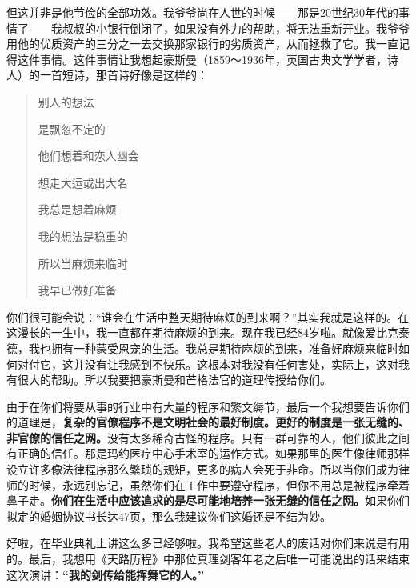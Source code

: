 但这并非是他节俭的全部功效。我爷爷尚在人世的时候——那是20世纪30年代的事情了——我叔叔的小银行倒闭了，如果没有外力的帮助，将无法重新开业。我爷爷用他的优质资产的三分之一去交换那家银行的劣质资产，从而拯救了它。我一直记得这件事情。这件事情让我想起豪斯曼（1859～1936年，英国古典文学学者，诗人）的一首短诗，那首诗好像是这样的：
\par

\begin{quotation}
别人的想法
\par

是飘忽不定的
\par

他们想着和恋人幽会
\par

想走大运或出大名
\par

我总是想着麻烦
\par

我的想法是稳重的
\par

所以当麻烦来临时
\par

我早已做好准备
\par
\end{quotation}

你们很可能会说：“谁会在生活中整天期待麻烦的到来啊？”其实我就是这样的。在这漫长的一生中，我一直都在期待麻烦的到来。现在我已经84岁啦。就像爱比克泰德，我也拥有一种蒙受恩宠的生活。我总是期待麻烦的到来，准备好麻烦来临时如何对付它，这并没有让我感到不快乐。这根本对我没有任何害处，实际上，这对我有很大的帮助。所以我要把豪斯曼和芒格法官的道理传授给你们。
\par

由于在你们将要从事的行业中有大量的程序和繁文缛节，最后一个我想要告诉你们的道理是，\textbf{复杂的官僚程序不是文明社会的最好制度。更好的制度是一张无缝的、非官僚的信任之网。}没有太多稀奇古怪的程序。只有一群可靠的人，他们彼此之间有正确的信任。那是玛约医疗中心手术室的运作方式。如果那里的医生像律师那样设立许多像法律程序那么繁琐的规矩，更多的病人会死于非命。所以当你们成为律师的时候，永远别忘记，虽然你们在工作中要遵守程序，但你不用总是被程序牵着鼻子走。\textbf{你们在生活中应该追求的是尽可能地培养一张无缝的信任之网。}如果你们拟定的婚姻协议书长达47页，那么我建议你们这婚还是不结为妙。
\par

好啦，在毕业典礼上讲这么多已经够啦。我希望这些老人的废话对你们来说是有用的。最后，我想用《天路历程》中那位真理剑客年老之后唯一可能说出的话来结束这次演讲：\textbf{“我的剑传给能挥舞它的人。”}
\par
